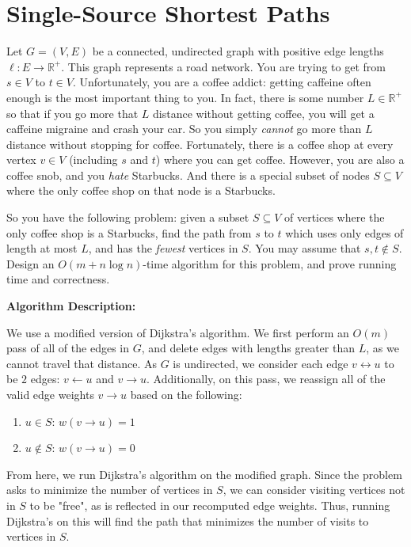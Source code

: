 \documentclass[11pt]{article}
\begin{document}
\section{Single-Source Shortest Paths}
Let $G = (V, E)$ be a connected, undirected graph with positive edge lengths $\ell : E \rightarrow \mathbb{R}^+$. This graph represents a road network. 
You are trying to get from $s \in V$ to $t \in V$. Unfortunately, you are a coffee addict: getting caffeine often enough is the most important thing to you. 
In fact, there is some number $L \in \mathbb{R}^+$ so that if you go more that $L$ distance without getting coffee, 
you will get a caffeine migraine and crash your car.  So you simply \emph{cannot} go more than $L$ distance without stopping for coffee. 
Fortunately, there is a coffee shop at every vertex $v \in V$ (including $s$ and $t$) where you can get coffee. 
However, you are also a coffee snob, and you \emph{hate} Starbucks. And there is a special subset of nodes $S \subseteq V$ 
where the only coffee shop on that node is a Starbucks.

So you have the following problem: given a subset $S \subseteq V$ of vertices where the only coffee shop is a Starbucks, 
find the path from $s$ to $t$ which uses only edges of length at most $L$, and has the \emph{fewest} vertices in $S$.  
You may assume that $s,t\not\in S$.  Design an $O(m + n\log n)$-time algorithm for this problem, and prove running time and correctness.

\bigbreak

\textbf{Algorithm Description:}

We use a modified version of Dijkstra's algorithm. 
We first perform an $O(m)$ pass of all of the edges in $G$, and delete edges with lengths greater than $L$, as we cannot travel that distance. 
As $G$ is undirected, we consider each edge $v \leftrightarrow u$ to be $2$ edges: $v \leftarrow u$ and $v \rightarrow u$. 
Additionally, on this pass, we reassign all of the valid edge weights $v \rightarrow u$ based on the following:

\begin{enumerate}[label=(\arabic*), noitemsep]
    \item $u \in S$: $w(v \rightarrow u) = 1$
    \item $u \notin S$: $w(v \rightarrow u) = 0$
\end{enumerate}

From here, we run Dijkstra's algorithm on the modified graph. Since the problem asks to minimize the number of vertices in $S$, 
we can consider visiting vertices not in $S$ to be "free", as is reflected in our recomputed edge weights. 
Thus, running Dijkstra's on this will find the path that minimizes the number of visits to vertices in $S$.
\end{document}
